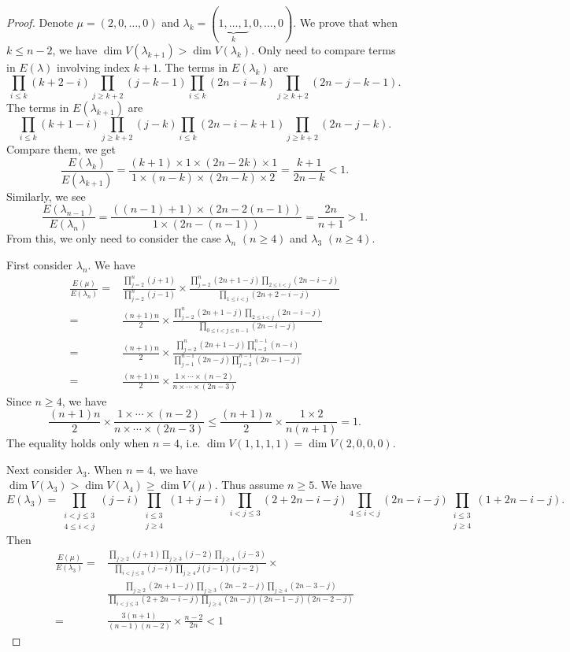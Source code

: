 \documentclass[a4paper]{amsart}
\theoremstyle{plain}
\theoremstyle{remark} \newtheorem{remark}[thm]{Remark}
\theoremstyle{remark} \newtheorem{exercise}{Exercise}
\theoremstyle{remark} \newtheorem{example}{Example}
\numberwithin{equation}{section}
\begin{document}
\begin{proof}
	Denote $\mu=(2,0,\ldots,0)$ and $\lambda_k=(\underbrace{1,\ldots,1}_k,0,\ldots,0)$. We prove that when $k\leqslant n-2$, we have $\dim V(\lambda_{k+1})>\dim V(\lambda_k)$. Only need to compare terms in $E(\lambda)$ involving index $k+1$. The terms in $E(\lambda_k)$ are
	\[\prod_{i\leqslant k}(k+2-i)\prod_{j\geqslant k+2}(j-k-1)\prod_{i\leqslant k}(2n-i-k)\prod_{j\geqslant k+2}(2n-j-k-1).\]
	The terms in $E(\lambda_{k+1})$ are
	\[\prod_{i\leqslant k}(k+1-i)\prod_{j\geqslant k+2}(j-k)\prod_{i\leqslant k}(2n-i-k+1)\prod_{j\geqslant k+2}(2n-j-k).\]
	Compare them, we get
	\[\frac{E(\lambda_k)}{E(\lambda_{k+1})}=\frac{(k+1)\times 1\times (2n-2k)\times 1}{1\times (n-k)\times (2n-k)\times 2}=\frac{k+1}{2n-k}<1.\]
	Similarly, we see
	\[\frac{E(\lambda_{n-1})}{E(\lambda_n)}=\frac{((n-1)+1)\times (2n-2(n-1))}{1\times (2n-(n-1))}=\frac{2n}{n+1}>1.\]
	From this, we only need to consider the case $\lambda_n$ $(n\geqslant 4)$ and $\lambda_3$ $(n\geqslant 4)$. 
	
	First consider $\lambda_n$. We have
	\begin{align*}
		\frac{E(\mu)}{E(\lambda_n)}=&\frac{\prod_{j=2}^n(j+1)}{\prod_{j=2}^n(j-1)}\times\frac{\prod_{j=2}^n(2n+1-j)\prod_{2\leqslant i<j}(2n-i-j)}{\prod_{1\leqslant i<j}(2n+2-i-j)}\\
		=&\frac{(n+1)n}{2}\times\frac{\prod_{j=2}^n(2n+1-j)\prod_{2\leqslant i<j}(2n-i-j)}{\prod_{0\leqslant i<j\leqslant n-1}(2n-i-j)}\\
		=&\frac{(n+1)n}{2}\times\frac{\prod_{j=2}^n(2n+1-j)\prod_{i=2}^{n-1}(n-i)}{\prod_{j=1}^{n-1}(2n-j)\prod_{j=2}^{n-1}(2n-1-j)}\\
		=&\frac{(n+1)n}{2}\times\frac{1\times\cdots\times(n-2)}{n\times\cdots\times(2n-3)}
	\end{align*}
	Since $n\geqslant 4$, we have
	\[\frac{(n+1)n}{2}\times\frac{1\times \cdots\times(n-2)}{n\times\cdots\times (2n-3)}\leqslant \frac{(n+1)n}{2}\times\frac{1\times 2}{n(n+1)}=1.\]
	The equality holds only when $n=4$, i.e. $\dim V(1,1,1,1)=\dim V(2,0,0,0)$.

	Next consider $\lambda_3$. When $n=4$, we have $\dim V(\lambda_3)>\dim V(\lambda_4)\geqslant \dim V(\mu)$. Thus assume $n\geqslant 5$. We have
	\[E(\lambda_3)=\prod_{\substack{i<j\leqslant 3\\4\leqslant i<j}}(j-i)\prod_{\substack{i\leqslant 3\\ j\geqslant 4}}(1+j-i)\prod_{i<j\leqslant 3}(2+2n-i-j)\prod_{4\leqslant i<j}(2n-i-j)\prod_{\substack{i\leqslant 3\\ j\geqslant 4}}(1+2n-i-j).\]
	Then
	\begin{align*}
		\frac{E(\mu)}{E(\lambda_3)}=&\frac{\prod_{j\geqslant 2}(j+1)\prod_{j\geqslant 3}(j-2)\prod_{j\geqslant 4}(j-3)}{\prod_{i<j\leqslant 3}(j-i)\prod_{j\geqslant 4}j(j-1)(j-2)}\times\\
		&\frac{\prod_{j\geqslant 2}(2n+1-j)\prod_{j\geqslant 3}(2n-2-j)\prod_{j\geqslant 4}(2n-3-j)}{\prod_{i<j\leqslant 3}(2+2n-i-j)\prod_{j\geqslant 4}(2n-j)(2n-1-j)(2n-2-j)}\\
		=&\frac{3(n+1)}{(n-1)(n-2)}\times\frac{n-2}{2n}<1
	\end{align*}
\end{proof}
\end{document}
